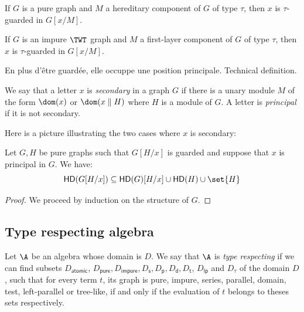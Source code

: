 \begin{proposition}
If $G$ is a pure graph and $M$ a hereditary component of $G$ of type  $\tau$, then $x$ is $\tau$-guarded in $G[x/M]$.

If $G$ is an impure $\TWT$ graph and $M$ a first-layer component of $G$ of type $\tau$, then $x$ is $\tau$-guarded in $G[x/M]$.


\end{proposition}

En plus d'être guardée, elle occuppe une position principale. Technical definition.

\begin{definition}
We say that a letter $x$ is \emph{secondary} in a graph $G$ if there is a unary module $M$ of the form $\dom(x)$ or $\dom(x\parallel H)$ where $H$  is a module of $G$.
A letter is \emph{principal} if it is not secondary.
\end{definition}
Here is a picture illustrating the two cases where  $x$ is secondary:
% 


\begin{lemma}\label{app-lem:pure-substitution}
Let $G, H$ be pure graphs such that $G[H/x]$ is guarded and suppose that $x$ is principal in $G$. We have: 
$$\mathsf{HD}(G[H/x])\subseteq  \mathsf{HD}(G)[H/x] \cup \mathsf{HD}(H) \cup \set{H} $$
\end{lemma}
\begin{proof}
We proceed by induction on the structure of $G$. 
\end{proof}


\subsection{Type respecting algebra}

\begin{definition}
Let  $\A$ be an algebra whose domain is $D$. We say that $\A$ is \emph{type respecting} if we can find subsets $D_\mathsf{atomic}$, $D_\mathsf{pure}, D_\mathsf{impure}, D_\mathsf{s}, D_\mathsf{p}, D_\mathsf{d}, D_\mathsf{t}$, $D_\mathsf{lp}$ and $D_\mathsf{\tau}$ of the domain $D$, such that for every term $t$, its graph is pure, impure,  series, parallel, domain, test, left-parallel or tree-like, if and only if the evaluation of $t$ belongs to theses sets respectively.  
\end{definition}

